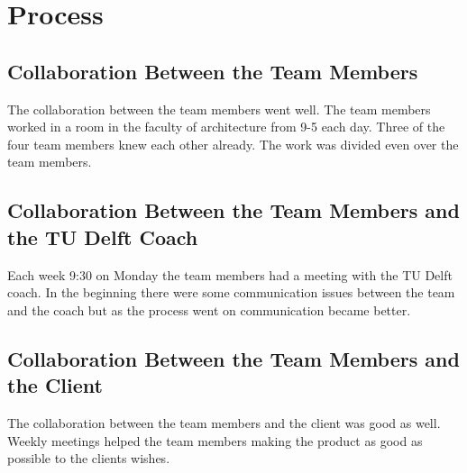 \section{Process}

\subsection{Collaboration Between the Team Members}
The collaboration between the team members went well. The team members worked in a room in the faculty of architecture from 9-5 each day. Three of the four team members knew each other already. The work was divided even over the team members. 

\subsection{Collaboration Between the Team Members and the TU Delft Coach}
Each week 9:30 on Monday the team members had a meeting with the TU Delft coach. In the beginning there were some communication issues between the team and the coach but as the process went on communication became better.

\subsection{Collaboration Between the Team Members and the Client}
The collaboration between the team members and the client was good as well. 
Weekly meetings helped the team members making the product as good as possible to the clients wishes. 